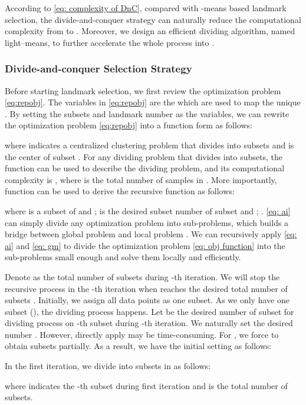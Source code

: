 \documentclass[a4paper,fleqn]{cas-dc}
\begin{document}
According to \eqref{eq: complexity of DnC}, compared with -means based landmark selection, the divide-and-conquer strategy can naturally reduce the computational complexity from  to .
Moreover, we design an efficient dividing algorithm, named light--means, to further accelerate the whole process into .

\subsubsection{Divide-and-conquer Selection Strategy}

Before starting landmark selection, we first review the optimization problem \eqref{eq:repobj}.
The variables in \eqref{eq:repobj} are the  which are used to map the unique .
By setting the subsets  and landmark number as the variables, we can rewrite the optimization problem \eqref{eq:repobj} into a function form as follows:

where  indicates a centralized clustering problem that divides  into  subsets and  is the center of subset .
For any dividing problem that divides  into  subsets, the function  can be used to describe the dividing problem, and its computational complexity is , where  is the total number of samples in . 
More importantly, function  can be used to derive the recursive function as follows:

where  is a subset of  and ;  is the desired subset number of subset  and ; .
\eqref{eq: ai} can simply divide any optimization problem into  sub-problems, which builds a bridge between global problem  and local problem .
We can recursively apply \eqref{eq: ai} and \eqref{eq: gm} to divide the optimization problem \eqref{eq: obj function} into the sub-problems small enough and solve them locally and efficiently. 

Denote  as the total number of subsets during -th iteration.
We will stop the recursive process in the -th iteration when  reaches the desired total number of subsets .
Initially, we assign all data points as one subset.
As we only have one subset (), the dividing process happens.
Let  be the desired number of subset for dividing process on -th subset during -th iteration.
We naturally set the desired number .
However, directly apply  may be time-consuming.
For , we force  to obtain subsets partially.
As a result, we have the initial setting as follows:

In the first iteration, we divide  into  subsets in as follows: 

where  indicates the -th subset during first iteration and  is the total number of subsets.
\end{document}
